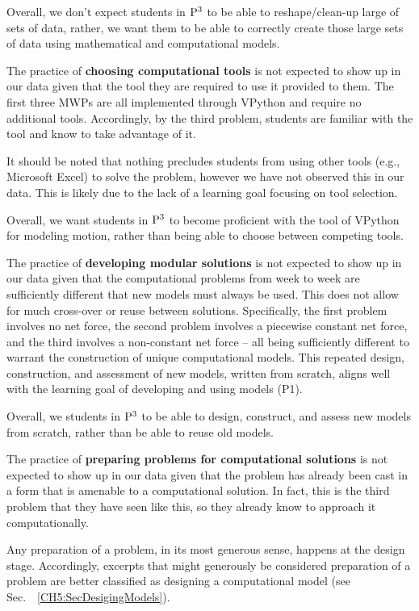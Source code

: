 \documentclass{msuphddissertation}
\begin{document}
\begin{doublespace}
Overall, we don't expect students in ${\rm P}^{3}$ to be able to reshape/clean-up large of sets of data, rather, we want them to be able to correctly create those large sets of data using mathematical and computational models.

The practice of \textbf{choosing computational tools} is not expected to show up in our data given that the tool they are required to use it provided to them.  The first three MWPs are all implemented through VPython and require no additional tools.  Accordingly, by the third problem, students are familiar with the tool and know to take advantage of it.

It should be noted that nothing precludes students from using other tools (e.g., Microsoft Excel) to solve the problem, however we have not observed this in our data.  This is likely due to the lack of a learning goal focusing on tool selection.  

Overall, we want students in ${\rm P}^{3}$ to become proficient with the tool of VPython for modeling motion, rather than being able to choose between competing tools.

The practice of \textbf{developing modular solutions} is not expected to show up in our data given that the computational problems from week to week are sufficiently different that new models must always be used.  This does not allow for much cross-over or reuse between solutions.  Specifically, the first problem involves no net force, the second problem involves a piecewise constant net force, and the third involves a non-constant net force -- all being sufficiently different to warrant the construction of unique computational models.  This repeated design, construction, and assessment of new models, written from scratch, aligns well with the learning goal of developing and using models (P1).

Overall, we students in ${\rm P}^{3}$ to be able to design, construct, and assess new models from scratch, rather than be able to reuse old models.

The practice of \textbf{preparing problems for computational solutions} is not expected to show up in our data given that the problem has already been cast in a form that is amenable to a computational solution.  In fact, this is the third problem that they have seen like this, so they already know to approach it computationally.

Any preparation of a problem, in its most generous sense, happens at the design stage.  Accordingly, excerpts that might generously be considered preparation of a problem are better classified as designing a computational model (see Sec.~~\ref{CH5:SecDesigingModels}).


\end{doublespace}
\end{document}
